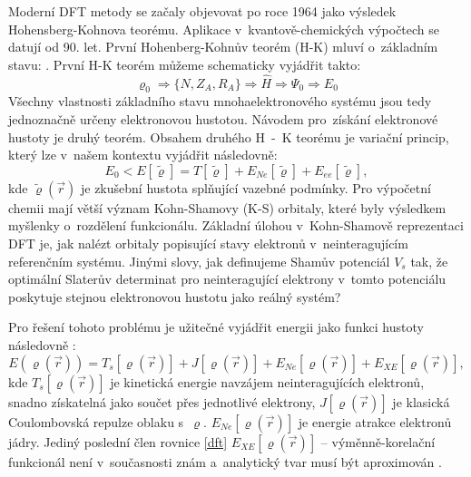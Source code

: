 \documentclass[
digital, %
table,   %
nolof,     %
nolot,     %
oneside,
]{fithesis3}
\begin{document}
Moderní DFT metody se začaly objevovat po roce 1964 jako výsledek Hohensberg-Kohnova teorému. Aplikace v~kvantově-chemických výpočtech se datují od 90. let. První Hohenberg-Kohnův teorém (H-K) mluví o~základním stavu: \cite{PhysRev.136.B864}. První H-K teorém můžeme schematicky vyjádřit takto:
\begin{equation}
\varrho_0 \Rightarrow \{N, Z_A, R_A\} \Rightarrow \widehat{H} \Rightarrow \Psi_0 \Rightarrow E_0
\end{equation}
Všechny vlastnosti základního stavu mnohaelektronového systému jsou tedy jednoznačně určeny elektronovou hustotou. Návodem pro~získání elektronové hustoty je druhý teorém. Obsahem druhého H~-~K teorému je variační princip, který lze v~našem kontextu vyjádřit následovně:
\begin{equation}
E_0 < E [\tilde{\varrho}] = T[\tilde{\varrho}] + E_{Ne}[\tilde{\varrho}] + E_{ee}[\tilde{\varrho}],
\end{equation}
kde $\tilde{\varrho}(\vec{r})$ je zkušební hustota splňující vazebné podmínky. Pro výpočetní chemii mají větší význam Kohn-Shamovy (K-S) orbitaly, které byly výsledkem myšlenky o~rozdělení funkcionálu. Základní úlohou v~Kohn-Shamově reprezentaci DFT je, jak nalézt orbitaly popisující stavy elektronů v~neinteragujícím referenčním systému. Jinými slovy, jak definujeme Shamův potenciál $V_s$ tak, že optimální Slaterův determinat pro neinteragující elektrony v~tomto potenciálu poskytuje stejnou elektronovou hustotu jako reálný systém?

Pro řešení tohoto problému je užitečné vyjádřit energii jako funkci hustoty následovně \cite{jensen2007introduction, koch2000chemist}:
\begin{equation}
E(\varrho(\vec{r})) = T_s[\varrho(\vec{r})] + J[\varrho(\vec{r})] + E_{Ne}[\varrho(\vec{r})] + E_{XE}[\varrho(\vec{r})],
\label{dft}
\end{equation}
kde $T_s[\varrho(\vec{r})]$ je kinetická energie navzájem neinteragujících elektronů, snadno získatelná jako součet přes jednotlivé elektrony, $J[\varrho(\vec{r})]$ je klasická Coulombovská repulze oblaku s~$\varrho$.
$E_{Ne}[\varrho(\vec{r})]$ je energie atrakce elektronů jádry. Jediný poslední člen rovnice \ref{dft} $E_{XE}[\varrho(\vec{r})] $ -- výměnně-korelační funkcionál není v~současnosti znám a~analytický tvar musí být aproximován \cite{parr1994density}.
\end{document}
